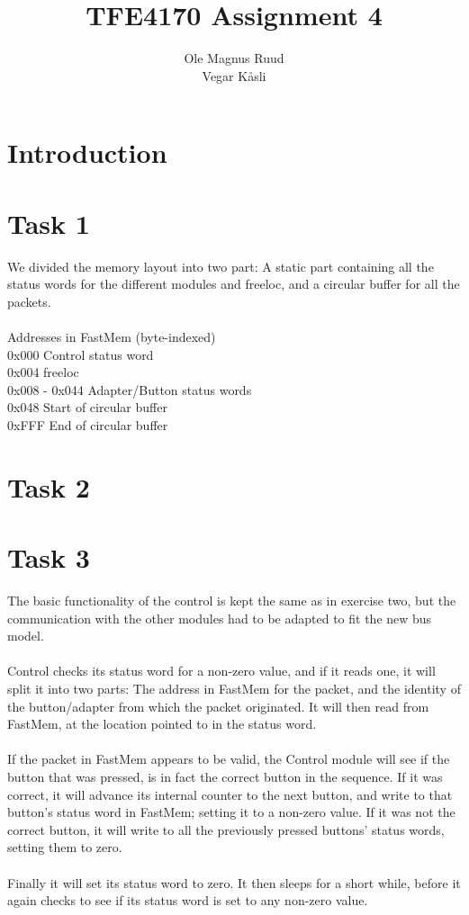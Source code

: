 \documentclass[11pt]{report}
\title{TFE4170 Assignment 4}
\author{Ole Magnus Ruud \\ Vegar K\aa sli}
\begin{document}
\maketitle
\clearpage

\section*{Introduction}


\section*{Task 1}
We divided the memory layout into two part: A static part containing all the
status words for the different modules and freeloc, and a circular buffer for
all the packets. 
\\
\\Addresses in FastMem (byte-indexed)
\\0x000 Control status word
\\0x004 freeloc
\\0x008 - 0x044 Adapter/Button status words
\\0x048 Start of circular buffer
\\0xFFF End of circular buffer

\section*{Task 2}

\section*{Task 3}
The basic functionality of the control is kept the same as in exercise two, but
the communication with the other modules had to be adapted to fit the new bus
model.\\
\\Control checks its status word for a non-zero value, and if it reads one, it
will split it into two parts: The address in FastMem for the packet, and the
identity of the button/adapter from which the packet originated. It will then
read from FastMem, at the location pointed to in the status word.\\
\\If the packet in FastMem appears to be valid, the Control module will see if
the button that was pressed, is in fact the correct button in the sequence. If
it was correct, it will advance its internal counter to the next button, and
write to that button's status word in FastMem; setting it to a non-zero value.
If it was not the correct button, it will write to all the previously pressed
buttons' status words, setting them to zero.\\
\\Finally it will set its status word to zero. It then sleeps for a short 
while, before it again checks to see if its status word is set to any non-zero 
value.
\end{document}

